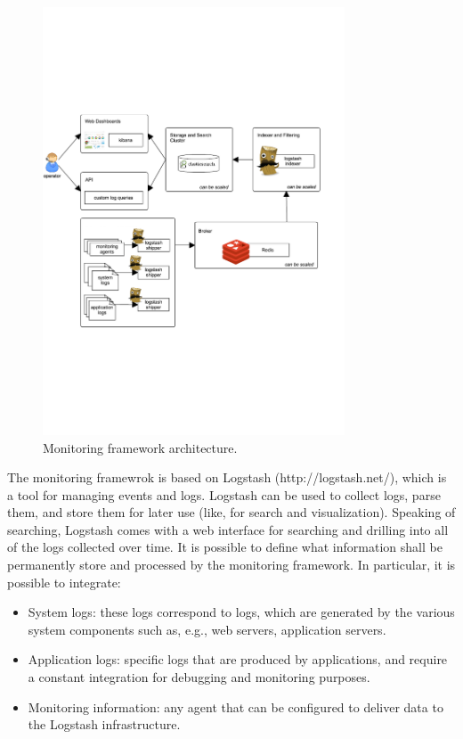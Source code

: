 \begin{figure}[!hbt]
\centering
\includegraphics[width=0.8\textwidth]{figs/monitoring.pdf}
\caption{Monitoring framework architecture.}
\end{figure}

The monitoring framewrok is based on Logstash (http://logstash.net/), which is a tool for managing events and logs. Logstash can be used to collect logs, parse them, and store them for later use (like, for search and visualization). Speaking of searching, Logstash comes with a web interface for searching and drilling into all of the logs collected over time.
It is possible to define what information shall be permanently store and processed by the monitoring framework. In particular, it is possible to integrate:
\begin{itemize}
\item System logs: these logs correspond to logs, which are generated by the various system components such as, e.g., web servers, application servers. 
\item Application logs: specific logs that are produced by applications, and require a constant integration for debugging and monitoring purposes.
\item Monitoring information: any agent that can be configured to deliver data to the Logstash infrastructure.
\end{itemize}

